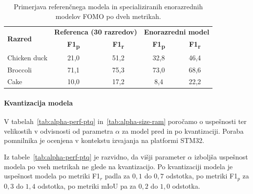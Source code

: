 \documentclass[a4paper,twoside,openright,12pt,slovene]{book}
\begin{document}
            \begin{table}[t]
                \centering
                \begin{tabular}{lcccc}
                    \toprule
                    \multirow{2}{*}{\textbf{Razred}} & \multicolumn{2}{c}{\textbf{Referenca (30 razredov)}} & \multicolumn{2}{c}{\textbf{Enorazredni model}} \\
                        & \textbf{F1\textsubscript{p}} & \textbf{F1\textsubscript{r}} & \textbf{F1\textsubscript{p}} & \textbf{F1\textsubscript{r}} \\
                    \midrule
                    Chicken duck & 21{,}0 & 51{,}2 & 32{,}8 & 46{,}4 \\
                    Broccoli     & 71{,}1 & 75{,}3 & 73{,}0 & 68{,}6 \\
                    Cake         & 10{,}0 & 17{,}2 & 8{,}4 & 22{,}2 \\
                    \bottomrule
                \end{tabular}
                \caption[Uspešnost specializiranih enorazrednih modelov FOMO]{Primerjava referenčnega modela in specializiranih enorazrednih modelov FOMO po dveh metrikah.}
                \label{tab:moe-results}
            \end{table}

            \FloatBarrier

            \paragraph{Kvantizacija modela}

            V tabelah~\ref{tab:alpha-perf-ptq}
            in~\ref{tab:alpha-size-ram}
            poročamo o uspešnosti ter velikostih v odvisnosti od parametra
            \(\alpha\) za model pred in po kvantizaciji. Poraba pomnilnika
            je ocenjena v kontekstu izvajanja na platformi STM32.

            Iz tabele~\ref{tab:alpha-perf-ptq}
            je
            razvidno, da višji parameter $\alpha$ izboljša uspešnost modela po
            vseh metrikah ne glede na kvantizacijo. Po kvantizaciji modela je
            uspešnost modela po metriki F1$_r$ padla za $0{,}1$ do $0{,}7$
            odstotka, po metriki F1$_p$ za $0{,}3$ do $1{,}4$ odstotka, po
            metriki mIoU pa za $0{,}2$ do $1{,}0$ odstotka. 
            
\end{document}
